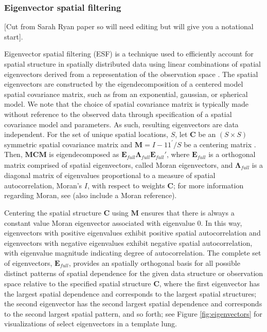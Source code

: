 \documentclass[12pt]{article}
\begin{document}
\subsubsection{Eigenvector spatial filtering}
[Cut from Sarah Ryan paper so will need editing but will give you a notational start].

Eigenvector spatial filtering (ESF) is a technique used to efficiently account for spatial structure in spatially distributed data using linear combinations of spatial eigenvectors derived from a representation of the observation space \citep{griffith1996spatial}. The spatial eigenvectors are constructed by the eigendecomposition of a centered model spatial covariance matrix, such as from an exponential, gaussian, or spherical model. We note that the choice of spatial covariance matrix is typically made without reference to the observed data through specification of a spatial covariance model and parameters. As such, resulting eigenvectors are data independent. For the set of unique spatial locations, $S$, let $\mathbf{C}$ be an $(S \times S)$ symmetric spatial covariance matrix and $\mathbf{M}=I - 11^\prime/S$ be a centering matrix \citep{griffith1996spatial}. Then, $\mathbf{M} \mathbf{C} \mathbf{M}$ is eigendecomposed as $\mathbf{E}_\textit{full} \mathbf{\Lambda}_\textit{full} \mathbf{E}_\textit{full}'$, where $\mathbf{E}_\textit{full}$ is a orthogonal matrix comprised of spatial eigenvectors, called Moran eigenvectors, and $\mathbf{\Lambda}_\textit{full}$ is a diagonal matrix of eigenvalues proportional to a measure of spatial autocorrelation, Moran's $I$, with respect to weights $\mathbf{C}$; for more information regarding Moran, see \cite{murakami2019eigenvector} (also include a Moran reference).

Centering the spatial structure $\mathbf C$ using $\mathbf M$ ensures that there is always a constant value Moran eigenvector associated with eigenvalue 0. In this way, eigenvectors with positive eigenvalues exhibit positive spatial autocorrelation and eigenvectors with negative eigenvalues exhibit negative spatial autocorrelation, with eigenvalue magnitude indicating degree of autocorrelation. The complete set of eigenvectors, $\mathbf{E}_\textit{full}$, provides an spatially orthogonal basis for all possible distinct patterns of spatial dependence for the given data structure or observation space relative to the specified spatial structure $\mathbf{C}$, where the first eigenvector has the largest spatial dependence and corresponds to the largest spatial structures; the second eigenvector has the second largest spatial dependence and corresponds to the second largest spatial pattern, and so forth; see Figure \ref{fig:eigenvectors} for visualizations of select eigenvectors in a template lung.
\end{document}
